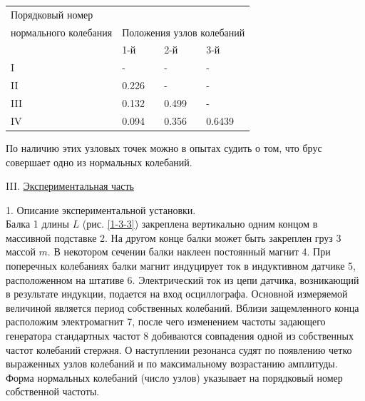 \documentclass[specialist, subf, href, colorlinks=true, 14pt, final]{disser}
\theoremstyle{definition}
\begin{document}
\begin{center}
\begin{tabular}{p{7cm} p{2.5cm} p{2.5cm} p{2.5cm}}
  Порядковый номер\\ нормального колебания & \multicolumn{3}{c}{Положения узлов колебаний} \\
  & 1-й & 2-й & 3-й\\
  I & - & - & -\\
  II & 0.226 & - & -\\
  III & 0.132 & 0.499 & -\\
  IV & 0.094 & 0.356 & 0.6439\\
\end{tabular}
\end{center}
\begin{figure}[!htp]
  \caption{}
  \label{1-3-2}
\end{figure}
\newpage
По наличию этих узловых точек можно в опытах судить о том, что брус совершает одно из нормальных колебаний.

\noindent III. \underline{Экспериментальная часть}

1. Описание экспериментальной установки.\\
Балка 1 длины $L$ (рис. \ref{1-3-3}) закреплена вертикально одним
концом в массивной подставке 2. На другом конце балки может быть закреплен груз 3 массой $m$. В некотором сечении балки наклеен постоянный магнит 4. При поперечных колебаниях балки магнит индуцирует ток в индуктивном датчике 5, расположенном на штативе 6. Электрический ток из цепи датчика, возникающий в результате индукции, подается на вход осциллографа. Основной измеряемой величиной является период собственных колебаний. Вблизи защемленного конца расположим электромагнит 7, после чего изменением частоты задающего генератора стандартных частот 8 добиваются совпадения одной из собственных частот колебаний стержня. О наступлении резонанса судят по появлению четко выраженных узлов колебаний и по максимальному возрастанию амплитуды. Форма нормальных колебаний (число узлов) указывает на порядковый номер собственной частоты.
\end{document}
